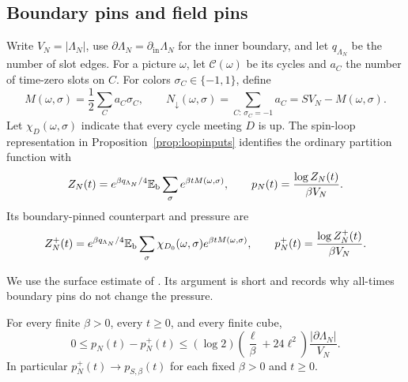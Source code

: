 \subsection{Boundary pins and field pins}

Write $V_N=|\Lambda_N|$, use
$\partial\Lambda_N=\partial_{\mathrm{in}}\Lambda_N$ for the inner
boundary, and let $q_{\Lambda_N}$ be the number of slot edges.
For a picture $\omega$, let $\mathcal C(\omega)$ be
its cycles and $a_C$ the number of time-zero slots on $C$.
For colors $\sigma_C\in\{-1,1\}$, define
\[
 M(\omega,\sigma)=\frac12\sum_Ca_C\sigma_C,
 \qquad
 N_\downarrow(\omega,\sigma)=\sum_{C:\,\sigma_C=-1}a_C
                              =SV_N-M(\omega,\sigma).
\]
Let $\chi_D(\omega,\sigma)$ indicate that every cycle meeting $D$
is up.  The spin-loop representation in
Proposition~\ref{prop:loopinputs} identifies the ordinary partition
function with
\[
 Z_N(t)=e^{\beta q_{\Lambda_N}/4}
       \mathbb E_{\rm b}\sum_\sigma e^{\beta tM(\omega,\sigma)},
 \qquad p_N(t)=\frac{\log Z_N(t)}{\beta V_N}.
\]
Its boundary-pinned counterpart and pressure are
\begin{equation}\label{eq:pinnedpressure}
 Z_N^+(t)=e^{\beta q_{\Lambda_N}/4}
       \mathbb E_{\rm b}\sum_\sigma
          \chi_{D_0}(\omega,\sigma)e^{\beta tM(\omega,\sigma)},
 \qquad
 p_N^+(t)=\frac{\log Z_N^+(t)}{\beta V_N}.
\end{equation}

We use the surface estimate of
\cite[Proposition~7.1]{BlochLaw}.  Its argument is short and records why
all-times boundary pins do not change the pressure.

\begin{lemma}\label{lem:surfacecost}
For every finite $\beta>0$, every $t\ge0$, and every finite cube,
\begin{equation}\label{eq:surfacecost}
 0\le p_N(t)-p_N^+(t)
 \le (\log2)\left(\frac\ell\beta+24\ell^2\right)
        \frac{|\partial\Lambda_N|}{V_N}.
\end{equation}
In particular $p_N^+(t)\to p_{S,\beta}(t)$ for each fixed
$\beta>0$ and $t\ge0$.
\end{lemma}


